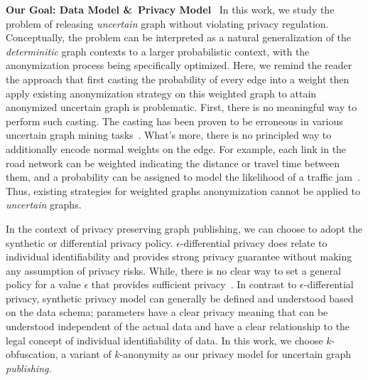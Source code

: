 \textbf{Our Goal: Data Model \&~Privacy Model}~
In this work, we study the problem of releasing \emph{uncertain} graph without violating privacy regulation. Conceptually, the problem can be interpreted as a natural generalization of the \emph{determinitic} graph contexts to a larger probabilistic context, with the anonymization process being specifically optimized. Here, we remind the reader the approach that first casting the probability of every edge into a weight then apply existing anonymization strategy on this weighted graph to attain anonymized uncertain graph is problematic. First, there is no meaningful way to perform such casting. The casting has been proven to be erroneous in various uncertain graph mining tasks~\cite{Potamias_K_2010,Zhao_Detecting_2014}. What's more, there is no principled way to additionally encode normal weights on the edge. For example, each link in the road network can be weighted indicating the distance or travel time between them, and a probability can be assigned to model the likelihood of a traffic jam~\cite{Jin_Distance_2011}. Thus, existing strategies for weighted graphs anonymization cannot be applied to \emph{uncertain} graphs.

In the context of privacy preserving graph publishing, we can choose to adopt the synthetic or differential privacy policy.
$\epsilon$-differential privacy does relate to individual identifiability and provides strong privacy guarantee without making any assumption of privacy risks. While, there is no clear way to set a general policy for a value $\epsilon$ that provides sufficient privacy~\cite{lee2011}. In contrast to $\epsilon$-differential privacy, synthetic privacy model can generally be defined and understood based on the data schema; parameters have a clear privacy meaning that can be understood independent of the actual data and have a clear relationship to the legal concept of individual identifiability of data. In this work, we choose $k$-obfuscation, a variant of $k$-anonymity as our privacy model for uncertain graph \emph{publishing}.

